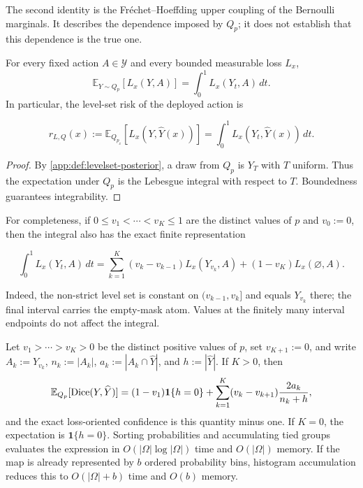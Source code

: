 The second identity is the Fr\'echet--Hoeffding upper coupling of the
Bernoulli marginals.  It describes the dependence imposed by $Q_p$; it
does not establish that this dependence is the true one.

\begin{proposition}
\label{app:prop:threshold-integral}
For every fixed action $A\in\mathcal{Y}$ and every bounded measurable
loss $L_x$,
\begin{equation*}
  \mathbb{E}_{Y\sim Q_p}[L_x(Y,A)]
  =\int_0^1 L_x(Y_t,A)\,dt.
\end{equation*}
In particular, the level-set risk of the deployed action is

\begin{equation*}
  r_{L,Q}(x)
  :=\mathbb{E}_{Q_{p_x}}[
      L_x(Y,\widehat Y(x))]
  =\int_0^1L_x(Y_t,\widehat Y(x))\,dt.
\end{equation*}
\end{proposition}

\begin{proof}
By \cref{app:def:levelset-posterior}, a draw from $Q_p$ is
$Y_T$ with $T$ uniform.  Thus the expectation under $Q_p$ is the
Lebesgue integral with respect to $T$.  Boundedness guarantees
integrability.
\end{proof}

For completeness, if $0\leq v_1<\cdots<v_K\leq1$ are the distinct
values of $p$ and $v_0:=0$, then the integral also has the exact finite
representation

\begin{equation*}
  \int_0^1 L_x(Y_t,A)\,dt
  =\sum_{k=1}^K(v_k-v_{k-1})L_x(Y_{v_k},A)
   +(1-v_K)L_x(\varnothing,A).
\end{equation*}

Indeed, the non-strict level set is constant on
$(v_{k-1},v_k]$ and equals $Y_{v_k}$ there; the final interval carries
the empty-mask atom.  Values at the finitely many interval endpoints do
not affect the integral.

\begin{corollary}
\label{app:cor:exact-dice}
Let $v_1>\cdots>v_K>0$ be the distinct positive values of $p$, set
$v_{K+1}:=0$, and write $A_k:=Y_{v_k}$,
$n_k:=|A_k|$, $a_k:=|A_k\cap\widehat Y|$, and
$h:=|\widehat Y|$. If $K>0$, then
\begin{equation*}
  \mathbb E_{Q_p}[\operatorname{Dice}(Y,\widehat Y)]
  =(1-v_1)\mathbf 1\{h=0\}
   +\sum_{k=1}^K
      (v_k-v_{k+1})\frac{2a_k}{n_k+h},
\end{equation*}
and the exact loss-oriented confidence is this quantity minus one. If $K=0$,
the expectation is $\mathbf 1\{h=0\}$. Sorting probabilities and accumulating
tied groups evaluates the expression in $O(|\Omega|\log|\Omega|)$ time and
$O(|\Omega|)$ memory. If the map is already represented by $b$ ordered
probability bins, histogram accumulation reduces this to $O(|\Omega|+b)$ time
and $O(b)$ memory.
\end{corollary}

